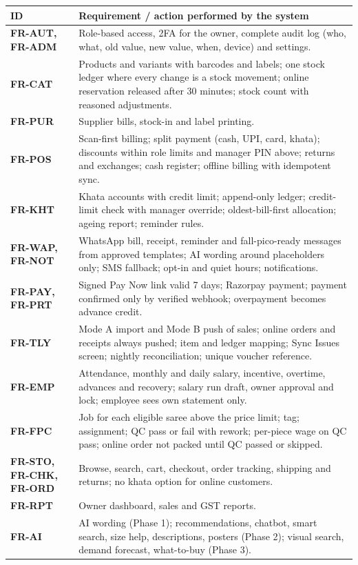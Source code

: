 \documentclass[12pt,a4paper]{article}
\providecommand{\real}[1]{#1}
\begin{document}
\begin{longtable}[]{@{}
  >{\raggedright\arraybackslash}p{(\columnwidth - 2\tabcolsep) * \real{0.1934}}
  >{\raggedright\arraybackslash}p{(\columnwidth - 2\tabcolsep) * \real{0.8066}}@{}}
\toprule\noalign{}
\textbf{ID} & \textbf{Requirement / action performed by the system} \\
\midrule\noalign{}
\endhead
\bottomrule\noalign{}
\endlastfoot
\textbf{FR-AUT, FR-ADM} & Role-based access, 2FA for the owner, complete
audit log (who, what, old value, new value, when, device) and
settings. \\
\textbf{FR-CAT} & Products and variants with barcodes and labels; one
stock ledger where every change is a stock movement; online reservation
released after 30 minutes; stock count with reasoned adjustments. \\
\textbf{FR-PUR} & Supplier bills, stock-in and label printing. \\
\textbf{FR-POS} & Scan-first billing; split payment (cash, UPI, card,
khata); discounts within role limits and manager PIN above; returns and
exchanges; cash register; offline billing with idempotent sync. \\
\textbf{FR-KHT} & Khata accounts with credit limit; append-only ledger;
credit-limit check with manager override; oldest-bill-first allocation;
ageing report; reminder rules. \\
\textbf{FR-WAP, FR-NOT} & WhatsApp bill, receipt, reminder and
fall-pico-ready messages from approved templates; AI wording around
placeholders only; SMS fallback; opt-in and quiet hours;
notifications. \\
\textbf{FR-PAY, FR-PRT} & Signed Pay Now link valid 7 days; Razorpay
payment; payment confirmed only by verified webhook; overpayment becomes
advance credit. \\
\textbf{FR-TLY} & Mode A import and Mode B push of sales; online orders
and receipts always pushed; item and ledger mapping; Sync Issues screen;
nightly reconciliation; unique voucher reference. \\
\textbf{FR-EMP} & Attendance, monthly and daily salary, incentive,
overtime, advances and recovery; salary run draft, owner approval and
lock; employee sees own statement only. \\
\textbf{FR-FPC} & Job for each eligible saree above the price limit;
tag; assignment; QC pass or fail with rework; per-piece wage on QC pass;
online order not packed until QC passed or skipped. \\
\textbf{FR-STO, FR-CHK, FR-ORD} & Browse, search, cart, checkout, order
tracking, shipping and returns; no khata option for online customers. \\
\textbf{FR-RPT} & Owner dashboard, sales and GST reports. \\
\textbf{FR-AI} & AI wording (Phase 1); recommendations, chatbot, smart
search, size help, descriptions, posters (Phase 2); visual search,
demand forecast, what-to-buy (Phase 3). \\
\end{longtable}
\end{document}
